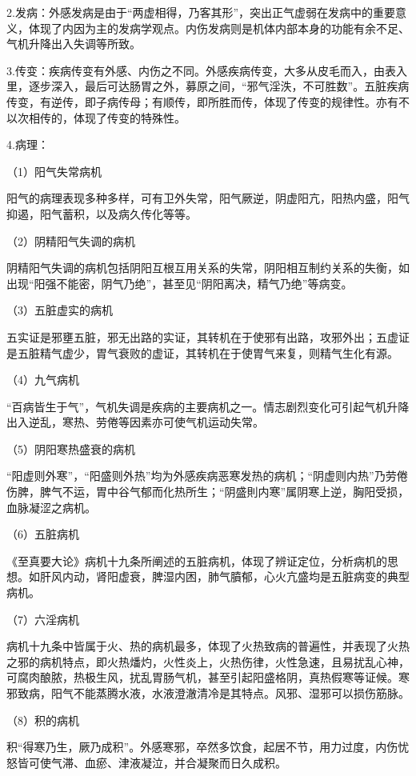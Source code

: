 \documentclass[draft,12pt]{ctexbook}
\begin{document}
2.发病：外感发病是由于“两虚相得，乃客其形”，突出正气虚弱在发病中的重要意义，体现了内因为主的发病学观点。内伤发病则是机体内部本身的功能有余不足、气机升降出入失调等所致。

3.传变：疾病传变有外感、内伤之不同。外感疾病传变，大多从皮毛而入，由表入里，逐步深入，最后可达肠胃之外，募原之间，“邪气淫泆，不可胜数”。五脏疾病传变，有逆传，即子病传母；有顺传，即所胜而传，体现了传变的规律性。亦有不以次相传的，体现了传变的特殊性。

4.病理：

（1）阳气失常病机

阳气的病理表现多种多样，可有卫外失常，阳气厥逆，阴虚阳亢，阳热内盛，阳气抑遏，阳气蓄积，以及病久传化等等。

（2）阴精阳气失调的病机

阴精阳气失调的病机包括阴阳互根互用关系的失常，阴阳相互制约关系的失衡，如出现“阳强不能密，阴气乃绝”，甚至见“阴阳离决，精气乃绝”等病变。

（3）五脏虚实的病机

五实证是邪壅五脏，邪无出路的实证，其转机在于使邪有出路，攻邪外出；五虚证是五脏精气虚少，胃气衰败的虚证，其转机在于使胃气来复，则精气生化有源。

（4）九气病机

“百病皆生于气”，气机失调是疾病的主要病机之一。情志剧烈变化可引起气机升降出入逆乱，寒热、劳倦等因素亦可使气机运动失常。

（5）阴阳寒热盛衰的病机

“阳虚则外寒”，“阳盛则外热”均为外感疾病恶寒发热的病机；“阴虚则内热”乃劳倦伤脾，脾气不运，胃中谷气郁而化热所生；“阴盛則内寒”属阴寒上逆，胸阳受损，血脉凝涩之病机。

（6）五脏病机

《至真要大论》病机十九条所阐述的五脏病机，体现了辨证定位，分析病机的思想。如肝风内动，肾阳虚衰，脾湿内困，肺气膹郁，心火亢盛均是五脏病变的典型病机。

（7）六淫病机

病机十九条中皆属于火、热的病机最多，体现了火热致病的普遍性，并表现了火热之邪的病机特点，即火热燔灼，火性炎上，火热伤律，火性急速，且易扰乱心神，可腐肉酿脓，热极生风，扰乱胃肠气机，甚至引起阳盛格阴，真热假寒等证候。寒邪致病，阳气不能蒸腾水液，水液澄澈清冷是其特点。风邪、湿邪可以损伤筋脉。

（8）积的病机

积“得寒乃生，厥乃成积”。外感寒邪，卒然多饮食，起居不节，用力过度，内伤忧怒皆可使气滞、血瘀、津液凝泣，并合凝聚而日久成积。

\ifx \allfiles \undefined
\end{document}
